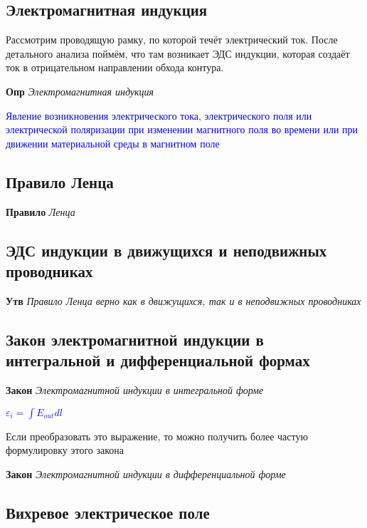 \documentclass[a4paper, 14pt]{article}
\begin{document}
    \subsection{Электромагнитная индукция}
    
    Рассмотрим проводящую рамку, по которой течёт электрический ток.
    После детального анализа поймём, что там возникает ЭДС индукции, которая создаёт ток в отрицательном направлении
    обхода контура.
    
    \textbf{Опр} \textit{Электромагнитная индукция}
    
    \textcolor{blue}{Явление возникновения электрического тока, электрического поля или электрической поляризации при
    изменении магнитного поля во времени или при движении материальной среды в магнитном поле}
    
    \subsection{Правило Ленца}
    
    \textbf{Правило} \textit{Ленца}
    
    \subsection{ЭДС индукции в движущихся и неподвижных проводниках}
    
    \textbf{Утв} \textit{Правило Ленца верно как в движущихся, так и в неподвижных проводниках}
    
    \subsection{Закон электромагнитной индукции в интегральной и дифференциальной формах}
    
    \textbf{Закон} \textit{Электромагнитной индукции в интегральной форме}
    
    \textcolor{blue}{$\varepsilon_i = \int E_{out} dl$}
    
    Если преобразовать это выражение, то можно получить более частую формулировку этого закона
    
    \textbf{Закон} \textit{Электромагнитной индукции в дифференциальной форме}
    
    \subsection{Вихревое электрическое поле}
    
\end{document}
